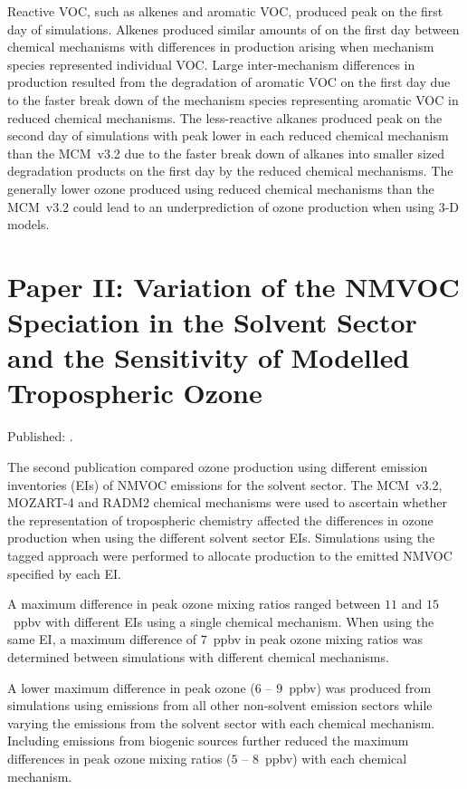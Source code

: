 Reactive VOC, such as alkenes and aromatic VOC, produced peak  on the first day of simulations.
Alkenes produced similar amounts of  on the first day between chemical mechanisms with differences in  production arising when mechanism species represented individual VOC.
Large inter-mechanism differences in  production resulted from the degradation of aromatic VOC on the first day due to the faster break down of the mechanism species representing aromatic VOC in reduced chemical mechanisms.
The less-reactive alkanes produced peak  on the second day of simulations with peak  lower in each reduced chemical mechanism than the MCM~v3.2 due to the faster break down of alkanes into smaller sized degradation products on the first day by the reduced chemical mechanisms.
The generally lower ozone produced using reduced chemical mechanisms than the MCM~v3.2 could lead to an underprediction of ozone production when using 3-D models.

\singlespacing
\section{Paper II: Variation of the NMVOC Speciation in the Solvent Sector and the Sensitivity of Modelled Tropospheric Ozone} \label{s:EI_results}
\onehalfspacing

\noindent
Published: .

The second publication compared ozone production using different emission inventories (EIs) of NMVOC emissions for the solvent sector.
The MCM~v3.2, MOZART-4 and RADM2 chemical mechanisms were used to ascertain whether the representation of tropospheric chemistry affected the differences in ozone production when using the different solvent sector EIs.
Simulations using the tagged approach were performed to allocate  production to the emitted NMVOC specified by each EI.

A maximum difference in peak ozone mixing ratios ranged between $11$ and $15$~ppbv with different EIs using a single chemical mechanism.
When using the same EI, a maximum difference of $7$~ppbv in peak ozone mixing ratios was determined between simulations with different chemical mechanisms.

A lower maximum difference in peak ozone ($6$ -- $9$~ppbv) was produced from simulations using emissions from all other non-solvent emission sectors while varying the emissions from the solvent sector with each chemical mechanism.
Including emissions from biogenic sources further reduced the maximum differences in peak ozone mixing ratios ($5$ -- $8$~ppbv) with each chemical mechanism.

